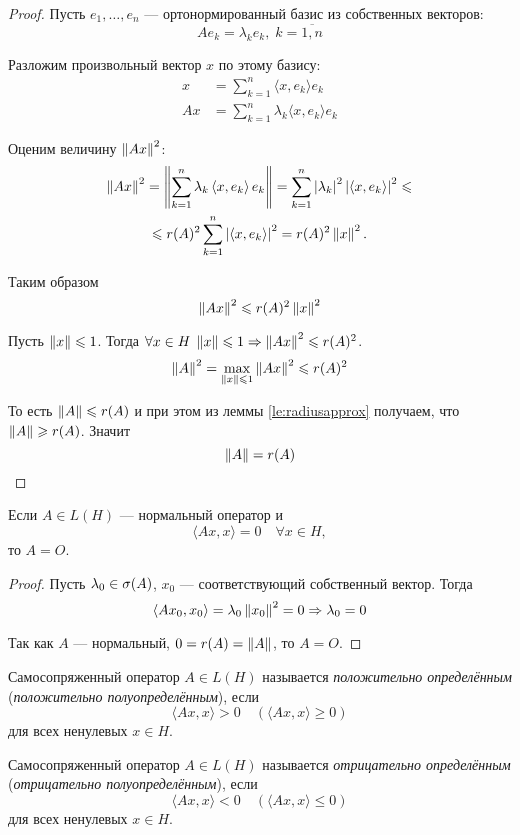 \begin{proof}
    Пусть $e_1, \dotsc, e_n$ --- ортонормированный базис из собственных
    векторов:
    \[ Ae_k = \lambda_k e_k, \; k = \overline{1,n}\]

    Разложим произвольный вектор $x$ по этому базису:
    \begin{align*}
        x &= \sum_{k=1}^n \langle x, e_k\rangle e_k \\
        Ax &= \sum_{k=1}^n \lambda_k \langle x, e_k\rangle e_k 
    \end{align*}

    Оценим величину $\left\|Ax\right\|^2$:
    \begin{multline*}
        \left\|Ax\right\|^2 = \left\|\sum_{k=1}^n \lambda_k \left< x, e_k\right> e_k\right\| =
        \sum_{k=1}^n \left|\lambda_k\right|^2 \left|\left< x, e_k\right>\right|^2 \leqslant \\ \leqslant
        r(A)^2 \sum_{k=1}^n \left|\left< x, e_k\right>\right|^2 = r(A)^2 \left\|x\right\|^2.
    \end{multline*}

    Таким образом
    \[ \left\|Ax\right\|^2 \leqslant r(A)^2 \left\|x\right\|^2 \]

    Пусть $\left\|x\right\| \leqslant 1$. Тогда $\forall x \in H\; \left\|x\right\| \leqslant 1 \Rightarrow \left\|Ax\right\|^2 \leqslant r(A)^2$.
    \[ \left\|A\right\|^2 = \max_{\left\|x\right\| \leqslant 1}\left\|Ax\right\|^2 \leqslant r(A)^2 \]

    То есть $\left\|A\right\| \leqslant r(A)$ и при этом из леммы \ref{le:radiusapprox}
    получаем, что $\left\|A\right\| \geqslant r(A)$. Значит
    \[ \left\|A\right\| = r(A) \]
\end{proof}

\begin{corollaryth}
    Если $A \in L(H)$ --- нормальный оператор и 
    \[\langle Ax, x\rangle = 0 \quad \forall x \in H, \] то $A = O$.
\end{corollaryth}

\begin{proof}
    Пусть $\lambda_0 \in \operatorname{\sigma}(A)$, $x_0$ --- соответствующий собственный
    вектор. Тогда
    \[ \left< Ax_0, x_0 \right> = \lambda_0 \left\|x_0\right\|^2 = 0 \Rightarrow
    \lambda_0 = 0 \]
    
    Так как $A$ --- нормальный, $0 = r(A) = \left\|A\right\|$, то $A = O$.
\end{proof}

\begin{definition}
    Самосопряженный оператор $A \in L(H)$ называется \emph{положительно
    определённым} (\emph{положительно полуопределённым}), если 
    \[\langle Ax, x\rangle > 0 \quad (\langle Ax, x\rangle \geq 0)\] 
    для всех ненулевых $x \in H$.

    Самосопряженный оператор $A \in L(H)$ называется \emph{отрицательно
    определённым} (\emph{отрицательно полуопределённым}), если 
    \[\langle Ax, x\rangle < 0 \quad (\langle Ax, x\rangle \leq 0)\] 
    для всех ненулевых $x \in H$.
\end{definition}

